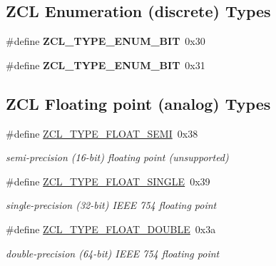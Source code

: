 \subsection*{Z\-C\-L Enumeration (discrete) Types}
\begin{DoxyCompactItemize}
\item 
\hypertarget{group__zcl__types_ga941ea2cc51c3a17d4ae9e095ae3a864f}{\#define {\bfseries Z\-C\-L\-\_\-\-T\-Y\-P\-E\-\_\-\-E\-N\-U\-M\-\_\-B\-I\-T}~0x30}\label{group__zcl__types_ga941ea2cc51c3a17d4ae9e095ae3a864f}

\item 
\hypertarget{group__zcl__types_ga6688181319502f973473d2cdf17e6260}{\#define {\bfseries Z\-C\-L\-\_\-\-T\-Y\-P\-E\-\_\-\-E\-N\-U\-M\-\_\-B\-I\-T}~0x31}\label{group__zcl__types_ga6688181319502f973473d2cdf17e6260}

\end{DoxyCompactItemize}
\subsection*{Z\-C\-L Floating point (analog) Types}
\begin{DoxyCompactItemize}
\item 
\hypertarget{group__zcl__types_ga8b1e3e1ec66f72995346c295e8ba3fe7}{\#define \hyperlink{group__zcl__types_ga8b1e3e1ec66f72995346c295e8ba3fe7}{Z\-C\-L\-\_\-\-T\-Y\-P\-E\-\_\-\-F\-L\-O\-A\-T\-\_\-\-S\-E\-M\-I}~0x38}\label{group__zcl__types_ga8b1e3e1ec66f72995346c295e8ba3fe7}

\begin{DoxyCompactList}\small\item\em semi-\/precision (16-\/bit) floating point (unsupported) \end{DoxyCompactList}\item 
\hypertarget{group__zcl__types_ga4b22fe5da2b5395e0cbd178054702602}{\#define \hyperlink{group__zcl__types_ga4b22fe5da2b5395e0cbd178054702602}{Z\-C\-L\-\_\-\-T\-Y\-P\-E\-\_\-\-F\-L\-O\-A\-T\-\_\-\-S\-I\-N\-G\-L\-E}~0x39}\label{group__zcl__types_ga4b22fe5da2b5395e0cbd178054702602}

\begin{DoxyCompactList}\small\item\em single-\/precision (32-\/bit) I\-E\-E\-E 754 floating point \end{DoxyCompactList}\item 
\hypertarget{group__zcl__types_ga447b33931d4cb320761a0e5034f494b2}{\#define \hyperlink{group__zcl__types_ga447b33931d4cb320761a0e5034f494b2}{Z\-C\-L\-\_\-\-T\-Y\-P\-E\-\_\-\-F\-L\-O\-A\-T\-\_\-\-D\-O\-U\-B\-L\-E}~0x3a}\label{group__zcl__types_ga447b33931d4cb320761a0e5034f494b2}

\begin{DoxyCompactList}\small\item\em double-\/precision (64-\/bit) I\-E\-E\-E 754 floating point \end{DoxyCompactList}\end{DoxyCompactItemize}

